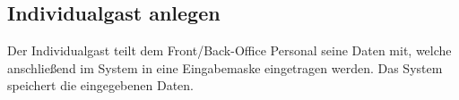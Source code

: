 \documentclass[../SubfileFeatures.tex]{subfiles}
\begin{document}
    \subsection{Individualgast anlegen}
    Der Individualgast teilt dem Front/Back-Office Personal seine Daten mit, welche anschließend im
    System in eine Eingabemaske eingetragen werden. Das System speichert die eingegebenen Daten.
\end{document}
